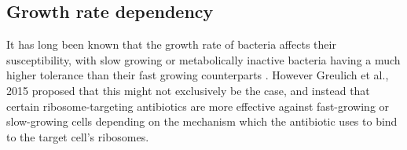 \documentclass[a4paper,12pt]{article}
\begin{document}
% 
% 
% 
% 

\subsection{Growth rate dependency} \label{subsec:GR-dependency}

It has long been known that the growth rate of bacteria affects their susceptibility, with slow growing or metabolically inactive bacteria having a much higher tolerance than their 
fast growing counterparts \cite{bioref:Cozens-slow-bac-grow-1986}.  However Greulich et al., 2015 \cite{bioref:Greulich-growthDependentAntibiotics} proposed that this might not
exclusively be the case, and instead that certain ribosome-targeting antibiotics are more effective against fast-growing or slow-growing cells depending on the mechanism which the 
antibiotic uses to bind to the target cell's ribosomes.
\end{document}
